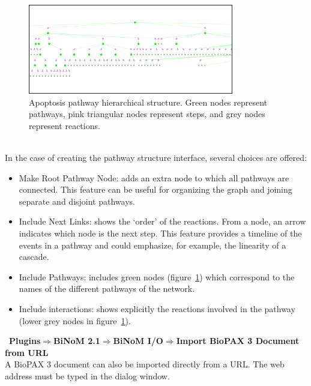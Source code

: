 \begin{figure}
\centering
\includegraphics[width=0.8\textwidth]{graphics/Apoptosis_pathway_hierarchical_structure}
\caption{Apoptosis pathway hierarchical structure. Green nodes represent
pathways, pink triangular nodes represent steps, and grey nodes represent
reactions.}
\label{Apoptosis_pathway_hierarchical_structure}
\end{figure}
\\In the case of creating the pathway structure interface, several choices are offered:
\begin{itemize}
\item Make Root Pathway Node: adds an extra node to which all pathways are connected. This feature can be useful for organizing the graph and joining separate and disjoint pathways.
\item Include Next Links: shows the ‘order’ of the reactions. From a node, an arrow indicates which node is the next step. This feature provides a timeline of the events in a pathway and could emphasize, for example, the linearity of a cascade.
\item Include Pathways: includes green nodes (figure~\ref{Apoptosis_pathway_hierarchical_structure}) which correspond to the names of the different pathways of the network.
\item Include interactions: shows explicitly the reactions involved in the pathway (lower grey nodes in figure~\ref{Apoptosis_pathway_hierarchical_structure}).
\end{itemize}\
\textbf{Plugins$\Rightarrow$BiNoM 2.1$\Rightarrow$BiNoM I/O$\Rightarrow$Import BioPAX 3 Document from URL}\\
A BioPAX 3 document can also be imported directly from a URL. The web address must be typed in the dialog window.

